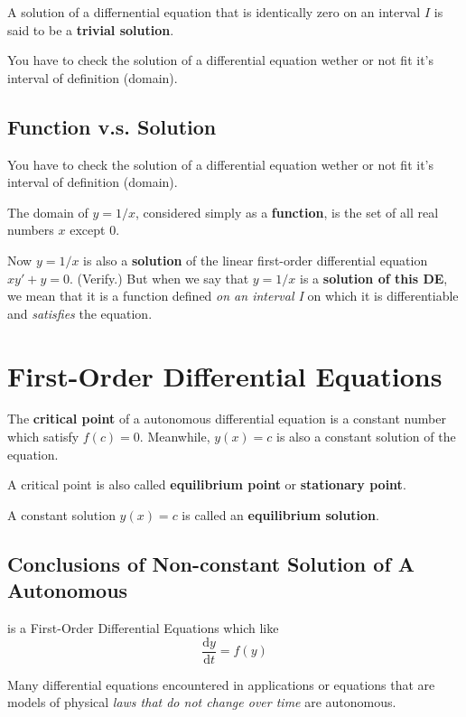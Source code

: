 \documentclass{beaulivre}
\begin{document}
A solution of a differnential equation that is identically zero
on an interval $I$ is said to be a \textbf{trivial solution}.

You have to check the solution of a differential equation wether
or not fit it's interval of definition (domain).

\subsection{Function v.s. Solution}

You have to check the solution of a differential equation wether
or not fit it's interval of definition (domain).

The domain of $y = 1/x$, considered simply as a \textbf{function}, 
is the set of all real numbers $x$ except $0$. 

Now $y = 1/x$ is also a \textbf{solution} 
of the linear first-order differential equation
$xy' + y = 0$. (Verify.) But when we say that $y = 1/x$ 
is a \textbf{solution of this DE}, we
mean that it is a function defined 
\emph{on an interval I} on which it is differentiable and
\emph{satisfies} the equation\cite{fcde}.

\section{First-Order Differential Equations}

The \textbf{critical point} of a autonomous differential equation
is a constant number which satisfy $f(c) = 0$.
Meanwhile, $y(x) = c$ is also a constant solution of the equation.

A critical point is also called \textbf{equilibrium point} or
\textbf{stationary point}.

A constant solution $y(x) = c$ is called an 
\textbf{equilibrium solution}\cite{fcde}.

\subsection{Conclusions of Non-constant Solution of A Autonomous}

\begin{definition}
     is a First-Order Differential Equations which like
    \[
        \dfrac{\mathrm{d}y}{\mathrm{d}t} = f(y)
    \]

    Many differential equations encountered in applications or equations that are
    models of physical \emph{laws that do not change over time} are autonomous\cite{fcde}.
\end{definition}
\end{document}

